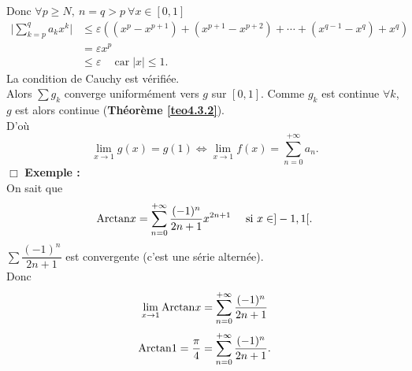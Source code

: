 \documentclass[11pt, a4paper]{book}
\newenvironment{pr}{\noindent {\bf Preuve} \noindent} {\hfill $\Box$\vskip 5mm}
\begin{document}
\begin{pr}
Donc $\forall p\geq N,~n=q>p~\forall x\in [0,1]$ 
\begin{align*}\Big|\sum_{k=p}^qa_kx^k\Big|&\leq \varepsilon\left((x^p-x^{p+1})+(x^{p+1}-x^{p+2})+\cdots+(x^{q-1}-x^q)+x^q\right)\\&=\varepsilon x^p\\&\leq \varepsilon~\quad \text{car}\;|x|\leq1.
\end{align*}
La condition de Cauchy est v\'erifi\'ee.\\ 
Alors $\sum g_k$ converge uniform\'ement vers $g$ sur $[0,1].$ Comme $g_k$ est continue $\forall k$, $g$ est alors continue (\textbf{Th\'eor\`eme \ref{teo4.3.2}}).\\ D'o\`u $$\lim_{x\rightarrow1}g(x)=g(1)\Leftrightarrow\lim_{x\rightarrow1}f(x)=\sum_{n=0}^{+\infty}a_n.$$
\end{pr}
\textbf{Exemple :} \\
On sait que $$\mathrm{Arctan} x=\sum_{n=0}^{+\infty}\dfrac{(-1)^n}{2n+1}x^{2n+1}\quad~\text{si}~x\in ]-1,1[.$$ $\sum \dfrac{(-1)^n}{2n+1}$ est convergente (c'est une s\'erie altern\'ee).\\
Donc $$\lim_{x\rightarrow1}\mathrm{Arctan} x=\sum_{n=0}^{+\infty}\dfrac{(-1)^n}{2n+1}$$
$$\mathrm{Arctan}1=\dfrac{\pi}{4}=\sum_{n=0}^{+\infty}\dfrac{(-1)^n}{2n+1}.$$
\end{document}
